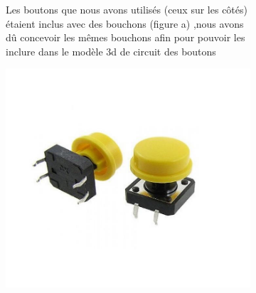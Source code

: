 \begin{figure}
    \begin{subfigure}[m]{.55\linewidth}
        Les boutons que nous avons utilisés (ceux sur les côtés) étaient inclus avec des bouchons (figure a) ,nous avons dû concevoir les mêmes bouchons afin pour pouvoir les inclure dans le modèle 3d de circuit des boutons 
    \end{subfigure}
    \begin{subfigure}[m]{.4\linewidth}
        \centering
        \includegraphics[width=\textwidth]{assets/conception1/img158.jpg}
        \caption{}
    \end{subfigure}
\end{figure}



